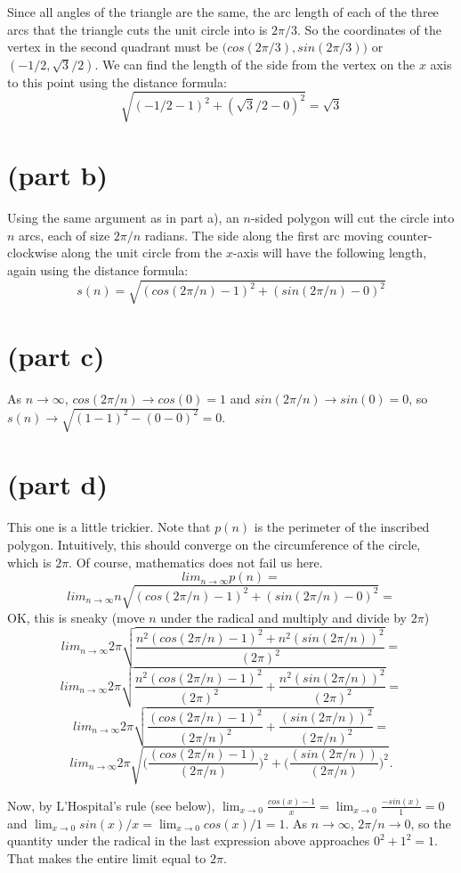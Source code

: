 \documentclass[11pt,a4paper]{report}
\theoremstyle{plain}
\theoremstyle{definition}
\theoremstyle{remark}
\begin{document}
Since all angles of the triangle are the same, the arc length of each of
the three arcs that the triangle cuts the unit circle into is $2\pi/3$. So the coordinates of the vertex in the second quadrant must be
$\big(cos(2\pi/3), sin(2\pi/3)\big)$ or $(-1/2,\sqrt{3}/2).$  We can find the length of the side from the vertex on the $x$ axis to this point using the distance formula:
$$\sqrt{(-1/2 - 1)^2 + (\sqrt{3}/2 - 0)^2} = \sqrt{3}$$

\section*{(part b)}
Using the same argument as in part a), an $n$-sided polygon will cut the circle into $n$ arcs, each of size $2\pi/n$ radians.  The side along the first arc moving counter-clockwise along the unit circle from the $x$-axis will have the following length, again using the distance formula:
$$s(n) = \sqrt{(cos(2\pi/n) - 1)^2 + (sin(2\pi/n) - 0)^2}$$

\section*{(part c)}
As $n \to \infty$, $cos(2\pi/n) \to cos(0) = 1$ and $sin(2\pi/n) \to sin(0) = 0$, so $s(n) \to \sqrt{ (1 - 1)^2 - (0 - 0)^2} = 0$.

\section*{(part d)}
This one is a little trickier.  Note that $p(n)$ is the perimeter of the inscribed polygon.  Intuitively, this should converge on the circumference of the circle, which is $2\pi$.  Of course, mathematics does not fail us here.
$$lim_{n\to\infty}p(n) = $$
$$lim_{n\to\infty} n\sqrt{(cos(2\pi/n) - 1)^2 + (sin(2\pi/n) - 0)^2} = $$
OK, this is sneaky (move $n$ under the radical and multiply and divide by $2\pi$)
$$lim_{n\to\infty}2\pi\sqrt{\frac{n^2(cos(2\pi/n) - 1)^2 + n^2(sin(2\pi/n))^2}{ (2\pi)^2}} = $$
$$lim_{n\to\infty}2\pi\sqrt{\frac{n^2(cos(2\pi/n) - 1)^2}{(2\pi)^2} + \frac{n^2(sin(2\pi/n))^2}{(2\pi)^2}} = $$
$$lim_{n\to\infty}2\pi\sqrt{\frac{(cos(2\pi/n) - 1)^2}{(2\pi/n)^2} + \frac{(sin(2\pi/n))^2}{(2\pi/n)^2}} = $$
$$ lim_{n\to\infty}2\pi\sqrt{\Big(\frac{(cos(2\pi/n) - 1)}{(2\pi/n)}\Big)^2 + \Big(\frac{(sin(2\pi/n))}{(2\pi/n)}\Big)^2}.$$

Now, by L'Hospital's rule (see below), $\lim_{x\to 0}\frac{cos(x) - 1}{x} = \lim_{x\to 0}\frac{-sin(x)}{1} = 0$ and $\lim_{x\to 0}sin(x)/x = \lim_{x\to 0}cos(x)/1 = 1$. As ${n\to\infty}$, $2\pi/n\to 0$, so the quantity under the radical in the last expression above approaches $0^2 + 1^2 = 1$.  That makes the entire limit equal to $2\pi$.  
\end{document}

